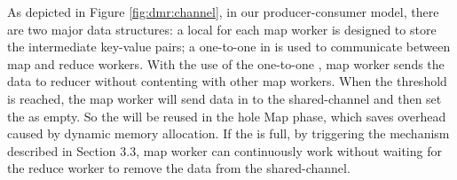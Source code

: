 As depicted in Figure \ref{fig:dmr:channel}, in our producer-consumer model, there are two major data structures:
a local  for each map worker is designed to store the intermediate key-value pairs; 
a one-to-one  in \myth is used to communicate between map and reduce workers.
With the use of the one-to-one , map worker sends the data to reducer without contenting with other map workers.
When the  threshold is reached,
the map worker will send data in  to the shared-channel and then set the  as empty.
So the  will be reused in the hole Map phase, which saves overhead caused by dynamic memory allocation.
If the  is full,  by triggering the  mechanism described in Section 3.3, map worker can continuously work without waiting for the reduce worker to remove the data from the shared-channel.





